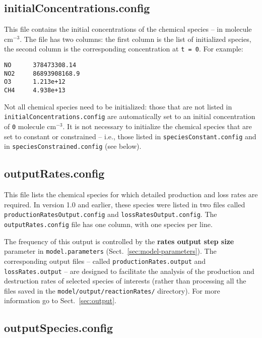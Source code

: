 \subsection{initialConcentrations.config} \label{subsec:initialconcentrations}

This file contains the initial concentrations of the chemical species
-- in molecule cm$^{-3}$. The file has two columns: the first column
is the list of initialized species, the second column is the
corresponding concentration at \texttt{t\ =\ 0}. For example:

\begin{verbatim}
NO      378473308.14
NO2     86893908168.9
O3      1.213e+12
CH4     4.938e+13
\end{verbatim}

Not all chemical species need to be initialized: those that are not
listed in \texttt{initialConcentrations.config} are automatically set
to an initial concentration of \texttt{0} molecule cm$^{-3}$. It is
not necessary to initialize the chemical species that are set to
constant or constrained -- i.e., those listed in
\texttt{speciesConstant.config} and in \texttt{speciesConstrained.config}
(see below).

\subsection{outputRates.config} \label{subsec:outputrates}

This file lists the chemical species for which detailed production and
loss rates are required. In version 1.0 and earlier, these species
were listed in two files called \texttt{productionRatesOutput.config}
and \texttt{lossRatesOutput.config}. The \texttt{outputRates.config}
file has one column, with one species per line.

The frequency of this output is controlled by the \textbf{rates output step size}
parameter in \texttt{model.parameters} (Sect.~\ref{sec:model-parameters}).
The corresponding output files -- called \texttt{productionRates.output}
and \texttt{lossRates.output} -- are designed to facilitate the
analysis of the production and destruction rates of selected species
of interests (rather than processing all the files saved in the
\texttt{model/output/reactionRates/} directory). For more information
go to Sect.~\ref{sec:output}.

\subsection{outputSpecies.config} \label{subsec:outputspecies}

